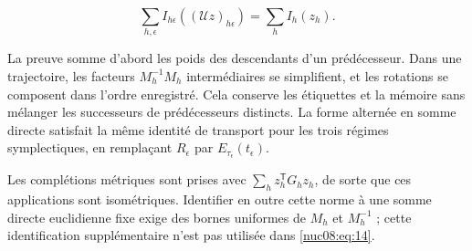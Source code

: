\begin{equation}
\sum_{h,\epsilon}I_{h\epsilon}((\mathscr U z)_{h\epsilon})
=\sum_h I_h(z_h).
\label{nuc08:eq:14}
\end{equation}

La preuve somme d’abord les poids des descendants d’un prédécesseur. Dans une trajectoire, les facteurs \(M_h^{-1}M_h\) intermédiaires se simplifient, et les rotations se composent dans l’ordre enregistré. Cela conserve les étiquettes et la mémoire sans mélanger les successeurs de prédécesseurs distincts. La forme alternée en somme directe satisfait la même identité de transport pour les trois régimes symplectiques, en remplaçant \(R_\epsilon\) par \(E_{\tau_\epsilon}(t_\epsilon)\).

Les complétions métriques sont prises avec \(\sum_h z_h^\mathsf TG_hz_h\), de sorte que ces applications sont isométriques. Identifier en outre cette norme à une somme directe euclidienne fixe exige des bornes uniformes de \(M_h\) et \(M_h^{-1}\) ; cette identification supplémentaire n’est pas utilisée dans \eqref{nuc08:eq:14}.
